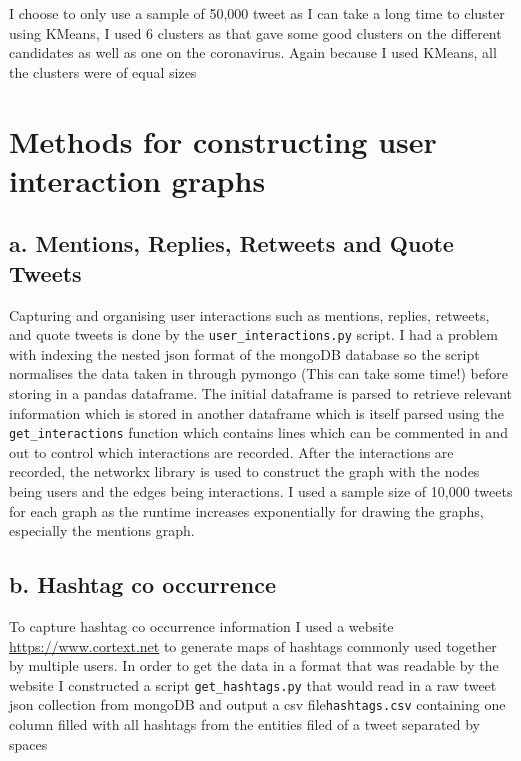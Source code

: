 \documentclass[10pt,a4paper]{article}
\begin{document}
I choose to only use a sample of 50,000 tweet as I can take a long time to cluster using KMeans, I used 6 clusters as that gave some good clusters on the different candidates as well as one on the coronavirus. Again because I used KMeans, all the clusters were of equal sizes

\section{Methods for constructing user interaction graphs}
\subsection*{a. Mentions, Replies, Retweets and Quote Tweets}
	Capturing and organising user interactions such as mentions, replies, retweets, and quote tweets is done by the \verb|user_interactions.py| script. I had a problem with indexing the nested json format of the mongoDB database so the script normalises the data taken in through pymongo (This can take some time!) before storing in a pandas dataframe. The initial dataframe is parsed to retrieve relevant information which is stored in another dataframe which is itself parsed using the \verb|get_interactions| function which contains lines which can be commented in and out to control which interactions are recorded. After the interactions are recorded, the networkx library is used to construct the graph with the nodes being users and the edges being interactions. I used a sample size of 10,000 tweets for each graph as the runtime increases exponentially for drawing the graphs, especially the mentions graph.
	
\subsection*{b. Hashtag co occurrence}	

	To capture hashtag co occurrence information I used a website \url{https://www.cortext.net} to generate maps of hashtags commonly used together by multiple users. In order to get the data in a format that was readable by the website I constructed a script \verb|get_hashtags.py| that would read in a raw tweet json collection from mongoDB and output a csv file\verb|hashtags.csv| containing one column filled with all hashtags from the entities filed of a tweet separated by spaces
	
\end{document}
